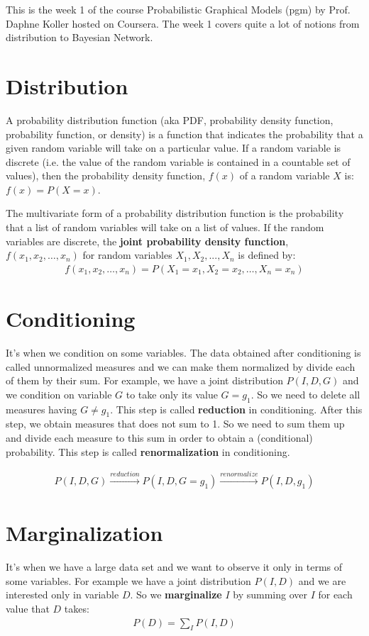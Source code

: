 This is the week 1 of the course Probabilistic Graphical Models (pgm) by Prof. Daphne Koller hosted on Coursera. The week 1 covers quite a lot of notions from distribution to Bayesian Network.

\section{Distribution}
A probability distribution function (aka PDF, probability density function, probability function, or density) is a function that indicates the probability that a given random variable will take on a particular value. If a random variable is discrete (i.e. the value of the random variable is contained in a countable set of values), then the probability density function, $f(x)$ of a random variable $X$ is: $f(x) = P(X = x)$.

The multivariate form of a probability distribution function is the probability that a list of random variables will take on a list of values. If the random variables are discrete, the \textbf{joint probability density function}, $f(x_1, x_2, …, x_n)$ for random variables $X_1, X_2, ..., X_n$ is defined by: 
\begin{align}
f(x_1, x_2, \ldots, x_n) = P(X_1=x_1, X_2=x_2, \ldots, X_n=x_n)
\end{align}

\section{Conditioning}
It's when we condition on some variables. The data obtained after conditioning is called unnormalized measures and we can make them normalized by divide each of them by their sum. For example, we have a joint distribution $P(I, D, G)$ and we condition on variable $G$ to take only its value $G = g_1$. So we need to delete all measures having $G \neq g_1$. This step is called \textbf{reduction} in conditioning. After this step, we obtain measures that does not sum to 1. So we need to sum them up and divide each measure to this sum in order to obtain a (conditional) probability. This step is called \textbf{renormalization} in conditioning.  

\begin{align}
P(I, D, G) \xrightarrow{reduction} P(I, D, G=g_1) \xrightarrow{renormalize} P(I, D, g_1)
\end{align}

\section{Marginalization}
It's when we have a large data set and we want to observe it only in terms of some variables. For example we have a joint distribution $P(I, D)$ and we are interested only in variable $D$. So we \textbf{marginalize} $I$ by summing over $I$ for each value that $D$ takes: 
\begin{align}
P(D) = \sum_{I} P(I, D)
\end{align}


